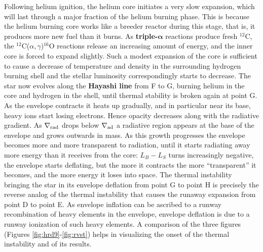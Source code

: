 \documentclass[a4paper,10pt]{article}
\begin{document}
{\noindent}Following helium ignition, the helium core initiates a very slow expansion, which will last through a major fraction of the helium burning phase. This is because the helium burning core works like a breeder reactor during this stage, that is, it produces more new fuel than it burns. As \textbf{triple-$\mathbf{α}$} reactions produce fresh $^{12}$C, the $^{12}$C($\alpha,\gamma$)$^{16}$O reactions release an increasing amount of energy, and the inner core is forced to expand slightly. Such a modest expansion of the core is sufficient to cause a decrease of temperature and density in the surrounding hydrogen burning shell and the stellar luminosity correspondingly starts to decrease. The star now evolves along the \textbf{Hayashi line} from F to G, burning helium in the core and hydrogen in the shell, until thermal stability is broken again at point G. As the envelope contracts it heats up gradually, and in particular near its base, heavy ions start losing electrons. Hence opacity decreases along with the radiative gradient. As $\nabla_{\rm rad}$ drops below $\nabla_{\rm ad}$ a radiative region appears at the base of the envelope and grows outwards in mass. As this growth progresses the envelope becomes more and more transparent to radiation, until it starts radiating away more energy than it receives from the core: $L_B-L_S$ turns increasingly negative, the envelope starts deflating, but the more it contracts the more ``transparent'' it becomes, and the more energy it loses into space. The thermal instability bringing the star in its envelope deflation from point G to point H is precisely the reverse analog of the thermal instability that causes the runaway expansion from point D to point E. As envelope inflation can be ascribed to a runway recombination of heavy elements in the envelope, envelope deflation is due to a runway ionization of such heavy elements. A comparison of the three figures (Figures \ref{fig:hrd9}-\ref{fig:rvst}) helps in visualizing the onset of the thermal instability and of its results.
\end{document}
